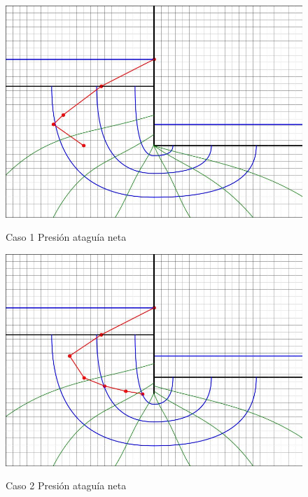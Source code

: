 \begin{figure}[H]
    \centering
    \begin{minipage}{0.32\textwidth}
        \centering
        \includegraphics[width=\textwidth]{GRAFICOS/caso_1_presion_ataguia_neta.jpg}
        \caption{Caso 1 Presión ataguía neta}
        \label{fig:caso_1_presion_ataguia_neta}
    \end{minipage}
    \begin{minipage}{0.32\textwidth}
        \centering
        \includegraphics[width=\textwidth]{GRAFICOS/caso_2_presion_ataguia_neta.jpg}
        \caption{Caso 2 Presión ataguía neta}
        \label{fig:caso_2_presion_ataguia_neta}
    \end{minipage}

\end{figure}
